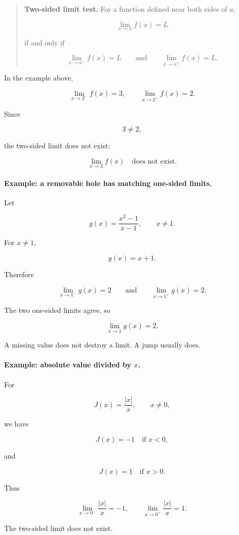 \begin{quote}
\textbf{Two-sided limit test.}
For a function defined near both sides of \(a\),

\[
\lim_{x\to a}f(x)=L
\]

if and only if

\[
\lim_{x\to a^-}f(x)=L
\qquad\text{and}\qquad
\lim_{x\to a^+}f(x)=L.
\]
\end{quote}

In the example above,

\[
\lim_{x\to2^-}f(x)=3,
\qquad
\lim_{x\to2^+}f(x)=2.
\]

Since

\[
3\neq2,
\]

the two-sided limit does not exist:

\[
\lim_{x\to2}f(x)\quad\text{does not exist.}
\]

\paragraph{Example: a removable hole has matching one-sided limits.}
Let

\[
g(x)=\frac{x^2-1}{x-1},
\qquad x\neq1.
\]

For \(x\neq1\),

\[
g(x)=x+1.
\]

Therefore

\[
\lim_{x\to1^-}g(x)=2
\qquad\text{and}\qquad
\lim_{x\to1^+}g(x)=2.
\]

The two one-sided limits agree, so

\[
\lim_{x\to1}g(x)=2.
\]

A missing value does not destroy a limit.  A jump usually does.

\paragraph{Example: absolute value divided by \(x\).}
For

\[
J(x)=\frac{|x|}{x},
\qquad x\neq0,
\]

we have

\[
J(x)=-1\quad\text{if }x<0,
\]

and

\[
J(x)=1\quad\text{if }x>0.
\]

Thus

\[
\lim_{x\to0^-}\frac{|x|}{x}=-1,
\qquad
\lim_{x\to0^+}\frac{|x|}{x}=1.
\]

The two-sided limit does not exist.

